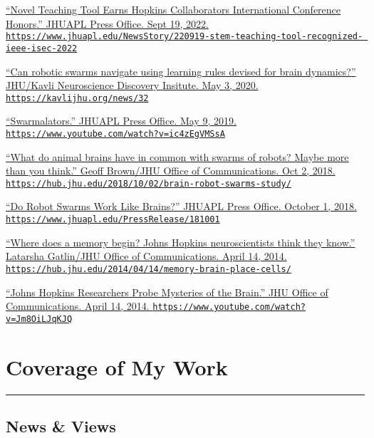 \documentclass[10pt]{article}
\newcommand{\itemtitle}[1]{{\color{hopkinsblue}\ul{#1}}}
\newcommand{\aurl}[1]{{\color{dimgray}\texttt{#1}}}
\newcommand{\newsection}[2]{%
  \section*{#1}
  \vspace{-.125in}
  \hrule
  \vspace{.22in}
  \label{sec:#2}
}
\begin{document}
\begin{description}
  \item \href{https://www.jhuapl.edu/NewsStory/220919-stem-teaching-tool-recognized-ieee-isec-2022}{
      ``\itemtitle{Novel Teaching Tool Earns Hopkins Collaborators
      International Conference Honors}.'' JHUAPL Press Office. Sept 19, 2022.
      \aurl{https://www.jhuapl.edu/NewsStory/220919-stem-teaching-tool-recognized- ieee-isec-2022}}
  \item \href{https://kavlijhu.org/news/32} {``\itemtitle{Can
        robotic swarms navigate using learning rules devised for brain
      dynamics?}'' JHU/Kavli Neuroscience Discovery Insitute. May 3, 2020.
    \aurl{https://kavlijhu.org/news/32}}
  \item \href{https://www.youtube.com/watch?v=ic4zEgVMSsA}
    {``\itemtitle{Swarmalators}.'' JHUAPL Press Office. May 9, 2019.
    \aurl{https://www.youtube.com/watch?v=ic4zEgVMSsA}}
  \item \href{https://hub.jhu.edu/2018/10/02/brain-robot-swarms-study/}
    {``\itemtitle{What do animal brains have in common with swarms of robots?
      Maybe more than you think}.'' Geoff Brown/JHU Office of Communications. Oct 2,
    2018. \aurl{https://hub.jhu.edu/2018/10/02/brain-robot-swarms-study/}}
  \item \href{https://www.jhuapl.edu/PressRelease/181001}
    {``\itemtitle{Do Robot Swarms Work Like Brains?}'' JHUAPL Press Office. October 1, 2018.
    \aurl{https://www.jhuapl.edu/PressRelease/181001}}
  \item \href{https://hub.jhu.edu/2014/04/14/memory-brain-place-cells/}
    {``\itemtitle{Where does a memory begin? Johns Hopkins neuroscientists think they
      know}.'' Latarsha Gatlin/JHU Office of Communications. April 14, 2014.
    \aurl{https://hub.jhu.edu/2014/04/14/memory-brain-place-cells/}}
  \item \href{https://www.youtube.com/watch?v=Jm8OiLJqKJQ}
    {``\itemtitle{Johns Hopkins Researchers Probe Mysteries of
      the Brain}.'' JHU Office of Communications. April 14, 2014.
    \aurl{https://www.youtube.com/watch?v=Jm8OiLJqKJQ}}
\end{description}

\newsection{Coverage of My Work}{press}

\subsection*{News \& Views}
\end{document}
